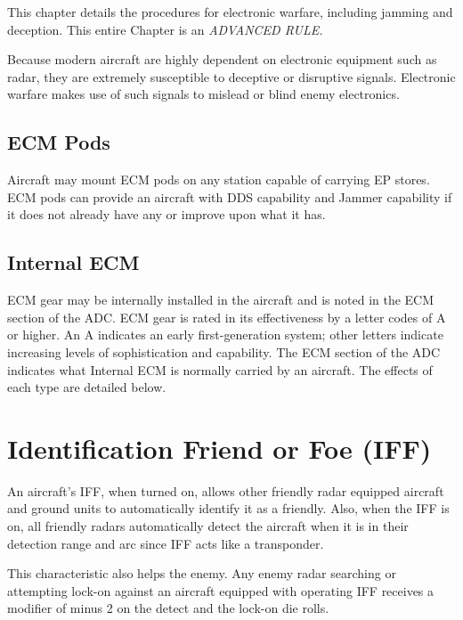 
\label{rule:electronic-warfare}

This chapter details the procedures for electronic warfare, including jamming and deception. This entire Chapter is an \emph{ADVANCED RULE.}

\begin{advancedrules}

    Because modern aircraft are highly dependent on electronic equipment such as radar, they are extremely susceptible to deceptive or disruptive signals.  Electronic warfare makes use of such signals to mislead or blind enemy electronics.

    \subsection{ECM Pods} Aircraft may mount ECM pods on any station capable of carrying EP stores. ECM pods can provide an aircraft with DDS capability and Jammer capability if it does not already have any or improve upon what it has.

    \subsection{Internal ECM} ECM gear may be internally installed in the aircraft and is noted in the ECM section of the ADC. ECM gear is rated in its effectiveness by a letter codes of A or higher. An A indicates an early first-generation system; other letters indicate increasing levels of sophistication and capability. The ECM section of the ADC indicates what Internal ECM is normally carried by an aircraft. The effects of each type are detailed below.

    \section{Identification Friend or Foe (IFF)}
    \label{rule:iff}

    An aircraft's IFF, when turned on, allows other friendly radar equipped aircraft and ground units to automatically identify it as a friendly. Also, when the IFF is on, all friendly radars automatically detect the aircraft when it is in their detection range and arc since IFF acts like a transponder.

    This characteristic also helps the enemy. Any enemy radar searching or attempting lock-on against an aircraft equipped with operating IFF receives a modifier of minus 2 on the detect and the lock-on die rolls.


\end{advancedrules}

